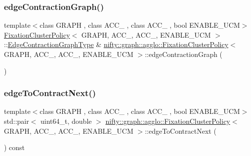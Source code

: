 \subsubsection{\texorpdfstring{edge\+Contraction\+Graph()}{edgeContractionGraph()}}
{\footnotesize\ttfamily template$<$class G\+R\+A\+PH , class A\+C\+C\+\_ , class A\+C\+C\+\_ , bool E\+N\+A\+B\+L\+E\+\_\+\+U\+CM$>$ \\
\hyperlink{classnifty_1_1graph_1_1agglo_1_1FixationClusterPolicy}{Fixation\+Cluster\+Policy}$<$ G\+R\+A\+PH, A\+C\+C\+\_, A\+C\+C\+\_, E\+N\+A\+B\+L\+E\+\_\+\+U\+CM $>$\+::\hyperlink{classnifty_1_1graph_1_1agglo_1_1FixationClusterPolicy_a90a9ab49f79eb7f52da75825e50a1c15}{Edge\+Contraction\+Graph\+Type} \& \hyperlink{classnifty_1_1graph_1_1agglo_1_1FixationClusterPolicy}{nifty\+::graph\+::agglo\+::\+Fixation\+Cluster\+Policy}$<$ G\+R\+A\+PH, A\+C\+C\+\_, A\+C\+C\+\_, E\+N\+A\+B\+L\+E\+\_\+\+U\+CM $>$\+::edge\+Contraction\+Graph (\begin{DoxyParamCaption}{ }\end{DoxyParamCaption})\hspace{0.3cm}{\ttfamily [inline]}}

\mbox{\label{classnifty_1_1graph_1_1agglo_1_1FixationClusterPolicy_a51448fa98e311f4f919756c63d23bffd}} 
\subsubsection{\texorpdfstring{edge\+To\+Contract\+Next()}{edgeToContractNext()}}
{\footnotesize\ttfamily template$<$class G\+R\+A\+PH , class A\+C\+C\+\_ , class A\+C\+C\+\_ , bool E\+N\+A\+B\+L\+E\+\_\+\+U\+CM$>$ \\
std\+::pair$<$ uint64\+\_\+t, double $>$ \hyperlink{classnifty_1_1graph_1_1agglo_1_1FixationClusterPolicy}{nifty\+::graph\+::agglo\+::\+Fixation\+Cluster\+Policy}$<$ G\+R\+A\+PH, A\+C\+C\+\_, A\+C\+C\+\_, E\+N\+A\+B\+L\+E\+\_\+\+U\+CM $>$\+::edge\+To\+Contract\+Next (\begin{DoxyParamCaption}{ }\end{DoxyParamCaption}) const\hspace{0.3cm}{\ttfamily [inline]}}

